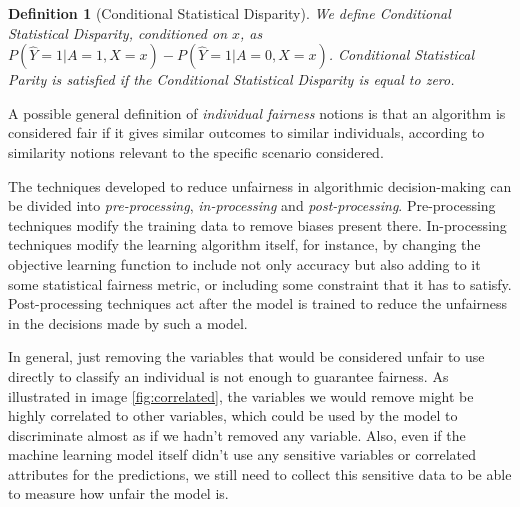 \documentclass[conference]{IEEEtran}
\newtheorem{definition}{Definition}
\begin{document}
\begin{definition}[Conditional Statistical Disparity] We define \emph{Conditional Statistical Disparity}, conditioned on $x$, as $P(\hat Y = 1| A = 1, X = x) - P(\hat Y = 1| A = 0, X = x)$. Conditional Statistical \emph{Parity} is \emph{satisfied} if the Conditional Statistical Disparity is equal to zero.
\end{definition}

A possible general definition of \emph{individual fairness} notions is that an algorithm is considered fair if it gives similar outcomes to similar individuals, according to similarity notions relevant to the specific scenario considered.

The techniques developed to reduce unfairness in algorithmic decision-making can be divided into \emph{pre-processing}, \emph{in-processing} and \emph{post-processing}. Pre-processing techniques modify the training data to remove biases present there. In-processing techniques modify the learning algorithm itself, for instance, by changing the objective learning function to include not only accuracy but also adding to it some statistical fairness metric, or including some constraint that it has to satisfy. Post-processing techniques act after the model is trained to reduce the unfairness in the decisions made by such a model.

In general, just removing the variables that would be considered unfair to use directly to classify an individual is not enough to guarantee fairness. As illustrated in image \ref{fig:correlated}, the variables we would remove might be highly correlated to other variables, which could be used by the model to discriminate almost as if we hadn't removed any variable. Also, even if the machine learning model itself didn't use any sensitive variables or correlated attributes for the predictions, we still need to collect this sensitive data to be able to measure how unfair the model is.
\end{document}
